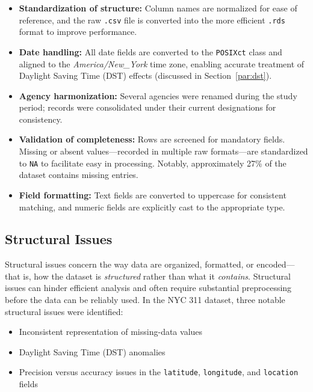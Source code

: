 \documentclass[linenumber]{jdsart}
\begin{document}
\begin{itemize}[left=1.5em]
  \item \textbf{Standardization of structure:} 
  Column names are normalized for ease of reference, and the raw 
  \texttt{.csv} file is converted into the more efficient 
  \texttt{.rds} format to improve performance.

  \item \textbf{Date handling:} 
  All date fields are converted to the \texttt{POSIXct} class and aligned 
  to the \textit{America/New\_York} time zone, enabling accurate 
  treatment of Daylight Saving Time (DST) effects 
  (discussed in Section~\ref{par:dst}).

  \item \textbf{Agency harmonization:} 
  Several agencies were renamed during the study period; records were 
  consolidated under their current designations for consistency.

  \item \textbf{Validation of completeness:} 
  Rows are screened for mandatory fields. 
  Missing or absent values—recorded in multiple raw formats—are 
  standardized to \texttt{NA} to facilitate easy in processing.
  Notably, approximately 27\% of the dataset contains missing entries.

  \item \textbf{Field formatting:} 
  Text fields are converted to uppercase for consistent matching, and 
  numeric fields are explicitly cast to the appropriate type.
\end{itemize}



\subsection{Structural Issues}
\label{subsec:structural}
Structural issues concern the way data are organized, formatted, or 
encoded---that is, how the dataset is \emph{structured} rather than 
what it \emph{contains}. Structural issues can hinder efficient analysis and often require 
substantial preprocessing before the data can be reliably used. 
In the \textsc{NYC 311} dataset, three notable structural issues were identified:

\begin{itemize}[left=1.5em]
  \item Inconsistent representation of missing-data values
  \item Daylight Saving Time (DST) anomalies
  \item Precision versus accuracy issues in the \texttt{latitude}, \texttt{longitude}, and \texttt{location} fields
\end{itemize}
\end{document}
